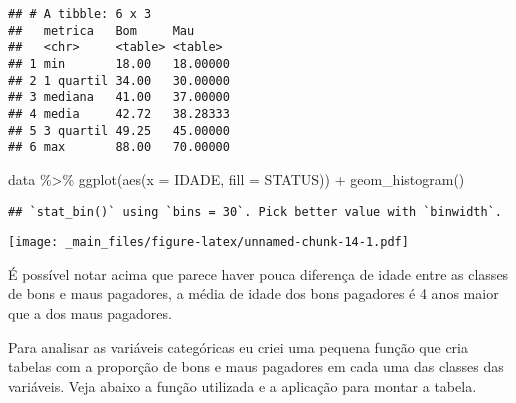 \documentclass[
]{book}
\newenvironment{Shaded}{\begin{snugshade}}{\end{snugshade}}
\newcommand{\AttributeTok}[1]{\textcolor[rgb]{0.77,0.63,0.00}{#1}}
\newcommand{\FunctionTok}[1]{\textcolor[rgb]{0.00,0.00,0.00}{#1}}
\newcommand{\NormalTok}[1]{#1}
\newcommand{\SpecialCharTok}[1]{\textcolor[rgb]{0.00,0.00,0.00}{#1}}
\begin{document}
\begin{verbatim}
## # A tibble: 6 x 3
##   metrica   Bom     Mau     
##   <chr>     <table> <table> 
## 1 min       18.00   18.00000
## 2 1 quartil 34.00   30.00000
## 3 mediana   41.00   37.00000
## 4 media     42.72   38.28333
## 5 3 quartil 49.25   45.00000
## 6 max       88.00   70.00000
\end{verbatim}

\begin{Shaded}
\begin{Highlighting}[]
\NormalTok{data }\SpecialCharTok{\%\textgreater{}\%}
  \FunctionTok{ggplot}\NormalTok{(}\FunctionTok{aes}\NormalTok{(}\AttributeTok{x =}\NormalTok{ IDADE, }\AttributeTok{fill =}\NormalTok{ STATUS)) }\SpecialCharTok{+}
  \FunctionTok{geom\_histogram}\NormalTok{()}
\end{Highlighting}
\end{Shaded}

\begin{verbatim}
## `stat_bin()` using `bins = 30`. Pick better value with `binwidth`.
\end{verbatim}

\texttt{[image: \_main\_files/figure-latex/unnamed-chunk-14-1.pdf]}

É possível notar acima que parece haver pouca diferença de idade entre as classes de bons e maus pagadores, a média de idade dos bons pagadores é 4 anos maior que a dos maus pagadores.

Para analisar as variáveis categóricas eu criei uma pequena função que cria tabelas com a proporção de bons e maus pagadores em cada uma das classes das variáveis. Veja abaixo a função utilizada e a aplicação para montar a tabela.
\end{document}
